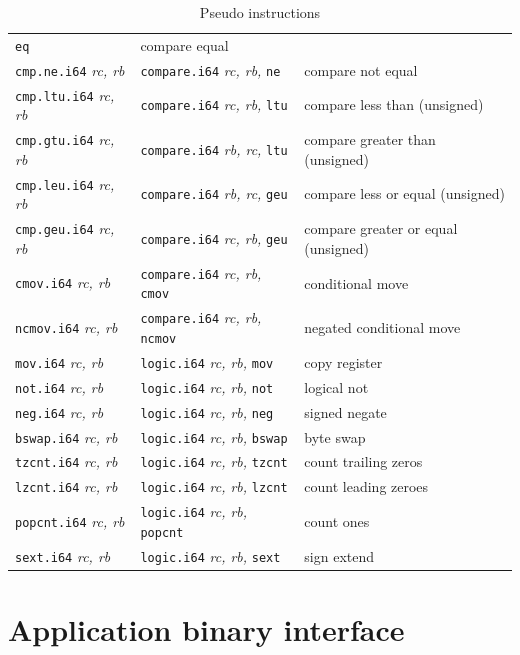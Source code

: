 \begin{table}[h]
\begin{tabular}{|l|l|l|}
\texttt{eq} & compare equal \\
\texttt{cmp.ne.i64} \emph{rc, rb} & \texttt{compare.i64} \emph{rc, rb,}
\texttt{ne} & compare not equal \\
\texttt{cmp.ltu.i64} \emph{rc, rb} & \texttt{compare.i64} \emph{rc, rb,}
\texttt{ltu} & compare less than (unsigned) \\
\texttt{cmp.gtu.i64} \emph{rc, rb} & \texttt{compare.i64} \emph{rb, rc,}
\texttt{ltu} & compare greater than (unsigned) \\
\texttt{cmp.leu.i64} \emph{rc, rb} & \texttt{compare.i64} \emph{rb, rc,}
\texttt{geu} & compare less or equal (unsigned) \\
\texttt{cmp.geu.i64} \emph{rc, rb} & \texttt{compare.i64} \emph{rc, rb,}
\texttt{geu} & compare greater or equal (unsigned) \\
\texttt{cmov.i64} \emph{rc, rb} & \texttt{compare.i64} \emph{rc, rb,}
\texttt{cmov} & conditional move \\
\texttt{ncmov.i64} \emph{rc, rb} & \texttt{compare.i64} \emph{rc, rb,}
\texttt{ncmov} & negated conditional move \\
\texttt{mov.i64} \emph{rc, rb} & \texttt{logic.i64} \emph{rc, rb,}
\texttt{mov} & copy register \\
\texttt{not.i64} \emph{rc, rb} & \texttt{logic.i64} \emph{rc, rb,}
\texttt{not} & logical not \\
\texttt{neg.i64} \emph{rc, rb} & \texttt{logic.i64} \emph{rc, rb,}
\texttt{neg} & signed negate \\
\texttt{bswap.i64} \emph{rc, rb} & \texttt{logic.i64} \emph{rc, rb,}
\texttt{bswap} & byte swap \\
\texttt{tzcnt.i64} \emph{rc, rb} & \texttt{logic.i64} \emph{rc, rb,}
\texttt{tzcnt} & count trailing zeros \\
\texttt{lzcnt.i64} \emph{rc, rb} & \texttt{logic.i64} \emph{rc, rb,}
\texttt{lzcnt} & count leading zeroes \\
\texttt{popcnt.i64} \emph{rc, rb} & \texttt{logic.i64} \emph{rc, rb,}
\texttt{popcnt} & count ones \\
\texttt{sext.i64} \emph{rc, rb} & \texttt{logic.i64} \emph{rc, rb,}
\texttt{sext} & sign extend \\
\hline
\end{tabular}
\caption{Pseudo instructions}
\label{tab:pseudo-instructions}
\end{table}

\newpage
\section{Application binary interface}

